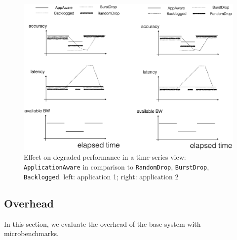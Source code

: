 \begin{figure}
  \centering
  \includegraphics[width=.95\linewidth]{figures/degrade-placeholder-2.png}
  \caption{Effect on degraded performance in a time-series view:
    \texttt{ApplicationAware} in comparison to \texttt{RandomDrop},
    \texttt{BurstDrop}, \texttt{Backlogged}. left: application 1; right:
    application 2}
  \label{fig:degrade-ts}
\end{figure}

\subsection{Overhead}
\label{sec:overhead}

In this section, we evaluate the overhead of the base system with
microbenchmarks.

